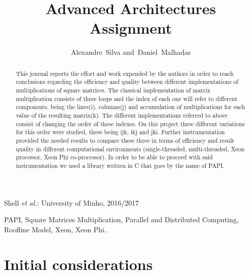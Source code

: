 \documentclass[journal]{IEEEtran}
\begin{document}
%
\title{Advanced Architectures Assignment}

\author{Alexandre~Silva
        and~Daniel~Malhadas}%

%
{Shell \MakeLowercase{\textit{et al.}}: University of Minho, 2016/2017}


\maketitle


\begin{abstract}
This journal reports the effort and work expended by the authors in order to reach conclusions regarding the efficiency and quality between different implementations of multiplications of square matrices. The classical implementation of matrix multiplication consists of three loops and the index of each one will refer to different components, being the lines(i), columns(j) and accumulation of multiplications for each value of the resulting matrix(k). The different implementations referred to above consist of changing the order of these indexes. On this project three different variations for this order were studied, these being ijk, ikj and jki. Further instrumentation provided the needed results to compare these three in terms of efficiency and result quality in different computational environments (single-threaded, multi-threaded, Xeon processor, Xeon Phi co-processor). In order to be able to proceed with said instrumentation we used a library written in C that goes by the name of PAPI.
\end{abstract}

\begin{IEEEkeywords}
PAPI, Square Matrices Multiplication, Parallel and Distributed Computing, Roofline Model, Xeon, Xeon Phi.
\end{IEEEkeywords}




\IEEEpeerreviewmaketitle

\section{Initial considerations}
\end{document}
